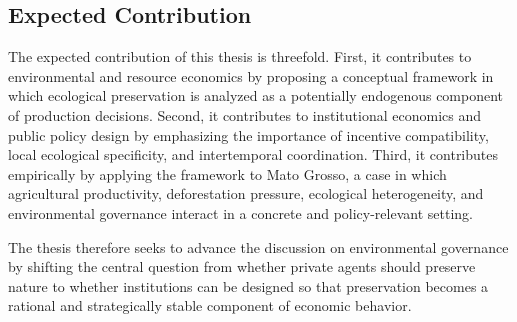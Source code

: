 \subsection{Expected Contribution}

The expected contribution of this thesis is threefold. First, it contributes to environmental and resource economics by proposing a conceptual framework in which ecological preservation is analyzed as a potentially endogenous component of production decisions. Second, it contributes to institutional economics and public policy design by emphasizing the importance of incentive compatibility, local ecological specificity, and intertemporal coordination. Third, it contributes empirically by applying the framework to Mato Grosso, a case in which agricultural productivity, deforestation pressure, ecological heterogeneity, and environmental governance interact in a concrete and policy-relevant setting.

The thesis therefore seeks to advance the discussion on environmental governance by shifting the central question from whether private agents should preserve nature to whether institutions can be designed so that preservation becomes a rational and strategically stable component of economic behavior.

\newpage

